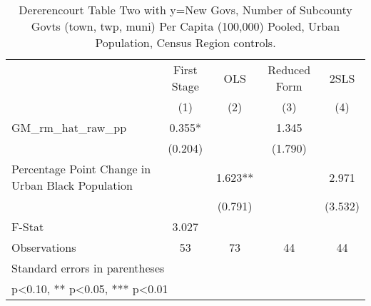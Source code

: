\begin{table}[htbp]\centering
\def\sym#1{\ifmmode^{#1}\else\(^{#1}\)\fi}
\caption{Dererencourt Table Two with y=New Govs, Number of Subcounty Govts (town, twp, muni) Per Capita (100,000) Pooled, Urban Population, Census Region controls.}
\begin{tabular}{l*{4}{c}}
\toprule
                    & First Stage   &         OLS   &Reduced Form   &        2SLS   \\
                    &\multicolumn{1}{c}{(1)}   &\multicolumn{1}{c}{(2)}   &\multicolumn{1}{c}{(3)}   &\multicolumn{1}{c}{(4)}   \\
\midrule
GM\_rm\_hat\_raw\_pp    &       0.355*  &               &       1.345   &               \\
                    &     (0.204)   &               &     (1.790)   &               \\
\addlinespace
Percentage Point Change in Urban Black Population&               &       1.623** &               &       2.971   \\
                    &               &     (0.791)   &               &     (3.532)   \\
\midrule
F-Stat              &       3.027   &               &               &               \\
Observations        &          53   &          73   &          44   &          44   \\
\bottomrule
\multicolumn{5}{l}{\footnotesize Standard errors in parentheses}\\
\multicolumn{5}{l}{\footnotesize * p<0.10, ** p<0.05, *** p<0.01}\\
\end{tabular}
\end{table}
